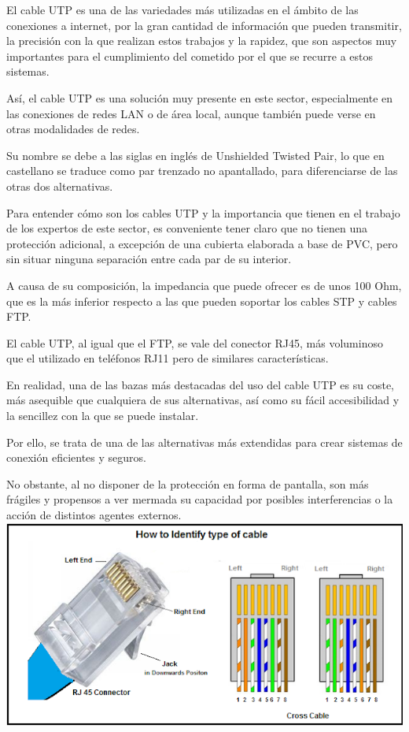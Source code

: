 \documentclass[]{article}
\begin{document}
El cable UTP es una de las variedades más utilizadas en el ámbito de las conexiones a internet, por la gran cantidad de información que pueden transmitir, la precisión con la que realizan estos trabajos y la rapidez, que son aspectos muy importantes para el cumplimiento del cometido por el que se recurre a estos sistemas.

Así, el cable UTP es una solución muy presente en este sector, especialmente en las conexiones de redes LAN o de área local, aunque también puede verse en otras modalidades de redes.

Su nombre se debe a las siglas en inglés de Unshielded Twisted Pair, lo que en castellano se traduce como par trenzado no apantallado, para diferenciarse de las otras dos alternativas.

Para entender cómo son los cables UTP y la importancia que tienen en el trabajo de los expertos de este sector, es conveniente tener claro que no tienen una protección adicional, a excepción de una cubierta elaborada a base de PVC, pero sin situar ninguna separación entre cada par de su interior.

A causa de su composición, la impedancia que puede ofrecer es de unos 100 Ohm, que es la más inferior respecto a las que pueden soportar los cables STP y cables FTP.

El cable UTP, al igual que el FTP, se vale del conector RJ45, más voluminoso que el utilizado en teléfonos RJ11 pero de similares características.

En realidad, una de las bazas más destacadas del uso del cable UTP es su coste, más asequible que cualquiera de sus alternativas, así como su fácil accesibilidad y la sencillez con la que se puede instalar.

Por ello, se trata de una de las alternativas más extendidas para crear sistemas de conexión eficientes y seguros.

No obstante, al no disponer de la protección en forma de pantalla, son más frágiles y propensos a ver mermada su capacidad por posibles interferencias o la acción de distintos agentes externos.\\


\includegraphics[scale=0.5]{identifying a calbe}
\end{document}
